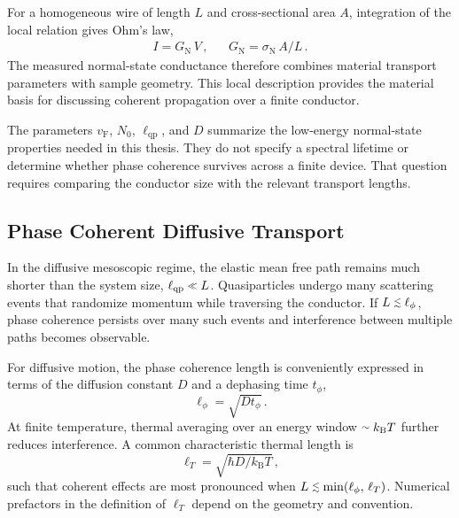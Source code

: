         For a homogeneous wire of length $L$ and cross-sectional area $A$, integration of the local relation gives Ohm's law,
        \begin{align}
            I = G_\mathrm{N}\,V\,, &&
            G_\mathrm{N} = \sigma_\mathrm{N}\,A/L\,.
        \end{align}
        The measured normal-state conductance therefore combines material transport parameters with sample geometry. This local description provides the material basis for discussing coherent propagation over a finite conductor. \cite{ohm_galvanische_1827}

        The parameters $v_\mathrm{F}$, $N_0$, $\ell_\mathrm{qp}$, and $D$ summarize the low-energy normal-state properties needed in this thesis. They do not specify a spectral lifetime or determine whether phase coherence survives across a finite device. That question requires comparing the conductor size with the relevant transport lengths.

    \subsection*{Phase Coherent Diffusive Transport}

        In the diffusive mesoscopic regime, the elastic mean free path remains much shorter than the system size, $\ell_\mathrm{qp} \sll L$. Quasiparticles undergo many scattering events that randomize momentum while traversing the conductor. If $L \slesssim \ell_\phi$, phase coherence persists over many such events and interference between multiple paths becomes observable.

        For diffusive motion, the phase coherence length is conveniently expressed in terms of the diffusion constant $D$ and a dephasing time $t_\phi$,
        \begin{equation}
            \ell_\phi = \sqrt{D t_\phi}\,.
        \end{equation}
        At finite temperature, thermal averaging over an energy window $\ssim k_\mathrm{B}T$ further reduces interference. A common characteristic thermal length is
        \begin{equation}
            \ell_T = \sqrt{\hbar D / k_\mathrm{B}T}\,,
        \end{equation}
        such that coherent effects are most pronounced when $L \slesssim \min(\ell_\phi,\,\ell_T)$. Numerical prefactors in the definition of $\ell_T$ depend on the geometry and convention. \cite{bergmann_weak_1984,lee_disordered_1985}

